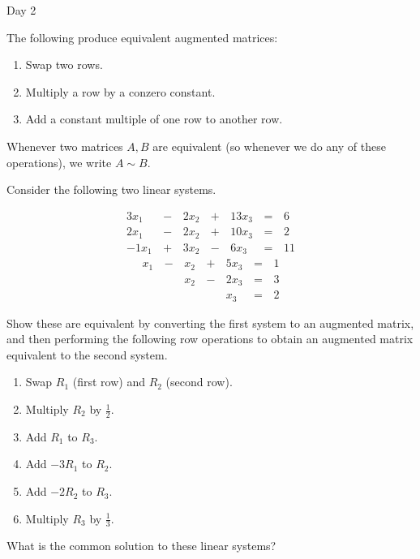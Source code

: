 
\begin{applicationActivities}{Day 2}

\begin{definition}
  The following  produce equivalent
  augmented matrices:
  \begin{enumerate}
    \item Swap two rows.
    \item Multiply a row by a conzero constant.
    \item Add a constant multiple of one row to another row.
  \end{enumerate}
  Whenever two matrices \(A,B\) are equivalent (so whenever we do any of
  these operations), we write \(A\sim B\).
\end{definition}

\begin{activity}{10}
  Consider the following two linear systems.
  \begin{multicols}{2}\noindent
    \begin{alignat*}{4}
      3x_1 &\,-\,& 2x_2 &\,+\,& 13x_3 &\,=\,& 6 \\
      2x_1 &\,-\,& 2x_2 &\,+\,& 10x_3 &\,=\,& 2 \\
     -1x_1 &\,+\,& 3x_2 &\,-\,&  6x_3 &\,=\,& 11
    \end{alignat*}
    \begin{alignat*}{4}
       x_1 &\,-\,&  x_2  &\,+\,&  5x_3 &\,=\,& 1 \\
           &\, \,&  x_2 &\,-\,&  2x_3 &\,=\,& 3 \\
           &\, \,&      &\, \,&   x_3 &\,=\,& 2
    \end{alignat*}
  \end{multicols}
  \begin{subactivity}
    Show these are equivalent by converting the first system to an augmented
    matrix, and then performing the following row operations to obtain
    an augmented matrix equivalent to the second system.
    \begin{multicols}{2}\noindent
    \begin{enumerate}
      \item Swap \(R_1\) (first row) and \(R_2\) (second row).
      \item Multiply \(R_2\) by \(\frac{1}{2}\).
      \item Add \(R_1\) to \(R_3\).
      \item Add \(-3R_1\) to \(R_2\).
      \item Add \(-2R_2\) to \(R_3\).
      \item Multiply \(R_3\) by \(\frac{1}{3}\).
    \end{enumerate}
    \end{multicols}
  \end{subactivity}
  \begin{subactivity}
    What is the common solution to these linear systems?
  \end{subactivity}
\end{activity}


\end{applicationActivities}
